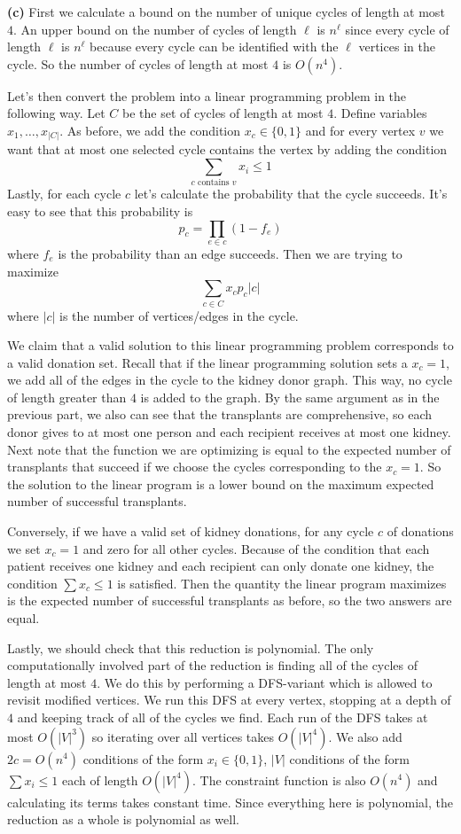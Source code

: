 \documentclass[11pt,letterpaper]{article}
\begin{document}
\begin{solution}
    \textbf{(c)} First we calculate a bound on the number of unique cycles of length at most $4$. An upper bound on the number of cycles of length $\ell$ is $n^\ell$ since every cycle of length $\ell$ is $n^\ell$ because every cycle can be identified with the $\ell$ vertices in the cycle. So the number of cycles of length at most $4$ is $O(n^4)$. 

    Let's then convert the problem into a linear programming problem in the following way. Let $C$ be the set of cycles of length at most $4$. Define variables $x_1,\ldots,x_{|C|}$. As before, we add the condition $x_c\in \{0,1\}$ and for every vertex $v$ we want that at most one selected cycle contains the vertex by adding the condition
    \[
        \sum_{c\textrm{ contains } v} x_i\leq 1
    \] 
    Lastly, for each cycle $c$ let's calculate the probability that the cycle succeeds. It's easy to see that this probability is
    \[
        p_c = \prod_{e\in c}(1-f_e)
    \] 
    where $f_e$ is the probability than an edge succeeds. Then we are trying to maximize
    \[
        \sum_{c\in C} x_cp_c|c|
    \] 
    where $|c|$ is the number of vertices/edges in the cycle.

    We claim that a valid solution to this linear programming problem corresponds to a valid donation set. Recall that if the linear programming solution sets a $x_c=1$, we add all of the edges in the cycle to the kidney donor graph. This way, no cycle of length greater than $4$ is added to the graph. By the same argument as in the previous part, we also can see that the transplants are comprehensive, so each donor gives to at most one person and each recipient receives at most one kidney. Next note that the function we are optimizing is equal to the expected number of transplants that succeed if we choose the cycles corresponding to the $x_c=1$. So the solution to the linear program is a lower bound on the maximum expected number of successful transplants.

    Conversely, if we have a valid set of kidney donations, for any cycle $c$ of donations we set $x_c=1$ and zero for all other cycles. Because of the condition that each patient receives one kidney and each recipient can only donate one kidney, the condition  $\sum x_c \leq 1$ is satisfied. Then the quantity the linear program maximizes is the expected number of successful transplants as before, so the two answers are equal.

    Lastly, we should check that this reduction is polynomial. The only computationally involved part of the reduction is finding all of the cycles of length at most $4$. We do this by performing a DFS-variant which is allowed to revisit modified vertices. We run this DFS at every vertex, stopping at a depth of $4$ and keeping track of all of the cycles we find. Each run of the DFS takes at most $O(|V|^3)$ so iterating over all vertices takes $O(|V|^4)$. We also add $2c=O(n^4)$ conditions of the form $x_i\in \{0,1\}$,  $|V|$ conditions of the form $\sum x_i \leq 1$ each of length $O(|V|^4)$. The constraint function is also $O(n^4)$ and calculating its terms takes constant time. Since everything here is polynomial, the reduction as a whole is polynomial as well.
\end{solution}
\end{document}
